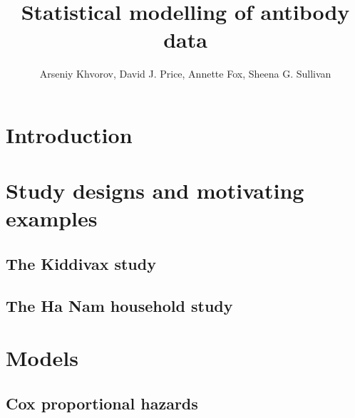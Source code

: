 \documentclass[12pt]{article}
\title{Statistical modelling of antibody data}
\author{Arseniy Khvorov, David J. Price, Annette Fox, Sheena G. Sullivan}
\begin{document}
\maketitle


\section{Introduction}



\section{Study designs and motivating examples}



\subsection{The Kiddivax study}



\subsection{The Ha Nam household study}



\section{Models}



\subsection{Cox proportional hazards}


\end{document}
